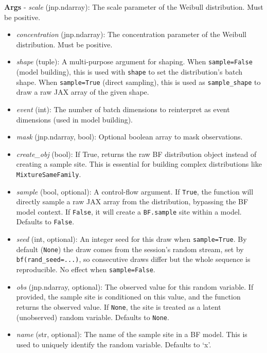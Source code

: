 \documentclass[
  letterpaper,
  DIV=11,
  numbers=noendperiod]{scrartcl}
\begin{document}
\textbf{Args} - \emph{scale} (jnp.ndarray): The scale parameter of the
Weibull distribution. Must be positive.

\begin{itemize}
\item
  \emph{concentration} (jnp.ndarray): The concentration parameter of the
  Weibull distribution. Must be positive.
\item
  \emph{shape} (tuple): A multi-purpose argument for shaping. When
  \texttt{sample=False} (model building), this is used with
  \texttt{shape} to set the distribution's batch shape. When
  \texttt{sample=True} (direct sampling), this is used as
  \texttt{sample\_shape} to draw a raw JAX array of the given shape.
\item
  \emph{event} (int): The number of batch dimensions to reinterpret as
  event dimensions (used in model building).
\item
  \emph{mask} (jnp.ndarray, bool): Optional boolean array to mask
  observations.
\item
  \emph{create\_obj} (bool): If True, returns the raw BF distribution
  object instead of creating a sample site. This is essential for
  building complex distributions like \texttt{MixtureSameFamily}.
\item
  \emph{sample} (bool, optional): A control-flow argument. If
  \texttt{True}, the function will directly sample a raw JAX array from
  the distribution, bypassing the BF model context. If \texttt{False},
  it will create a \texttt{BF.sample} site within a model. Defaults to
  \texttt{False}.
\item
  \emph{seed} (int, optional): An integer seed for this draw when
  \texttt{sample=True}. By default (\texttt{None}) the draw comes from
  the session's random stream, set by \texttt{bf(rand\_seed=...)}, so
  consecutive draws differ but the whole sequence is reproducible. No
  effect when \texttt{sample=False}.
\item
  \emph{obs} (jnp.ndarray, optional): The observed value for this random
  variable. If provided, the sample site is conditioned on this value,
  and the function returns the observed value. If \texttt{None}, the
  site is treated as a latent (unobserved) random variable. Defaults to
  \texttt{None}.
\item
  \emph{name} (str, optional): The name of the sample site in a BF
  model. This is used to uniquely identify the random variable. Defaults
  to `x'.
\end{itemize}
\end{document}

